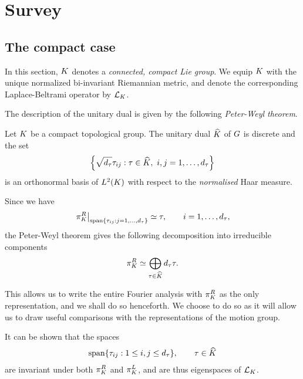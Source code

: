 \chapter{Survey}

\section{The compact case}

In this section,
$\CompactGroup$ denotes a \emph{connected, compact Lie group}.
We equip $\CompactGroup$ with the unique normalized bi-invariant Riemannian metric,
and denote the corresponding Laplace-Beltrami operator by $\Laplacian [\CompactGroup]$.

The description of the unitary dual is given by the following \emph{Peter-Weyl theorem}.

\begin{theorem}
\label{theorem:Peter-Weyl_theorem}
    Let $\CompactGroup$ be a compact topological group.
    The unitary dual $\dualGroup \CompactGroup$ of $\Group$ is discrete and
    the set
    \begin{align*}
        \left\{
            \sqrt{\dimRep\tau} \tau_{ij} : \tau \in \dualGroup\CompactGroup,\ i, j = 1, \dots, \dimRep\tau
        \right\}
    \end{align*}
    is an orthonormal basis of $\Lebesgue{2}{\CompactGroup}$ with respect to the \emph{normalised} Haar measure.
\end{theorem}

Since we have
\begin{align*}
    \eval \RightRegularRepresentation {\Span \{\tau_{i j} : j = 1, \dots, \dimRep \tau\}} \simeq \tau,
    \qquad i = 1, \dots, \dimRep \tau,
\end{align*}
the Peter-Weyl theorem gives the following decomposition into irreducible components
\begin{align*}
    \RightRegularRepresentation \simeq \bigoplus_{\tau \in \dualGroup \CompactGroup} \dimRep \tau \tau.
\end{align*}

This allows us to write the entire Fourier analysis with $\RightRegularRepresentation$ as the only representation,
and we shall do so henceforth.
We choose to do so as it will allow us to draw useful comparisons with the representations of the motion group.

It can be shown that the spaces
\begin{align*}
    \Span \{ \tau_{i j} : 1 \leq i, j \leq \dimRep \tau\}, \qquad \tau \in \dualGroup \CompactGroup
\end{align*}
are invariant under both $\RightRegularRepresentation$ and $\LeftRegularRepresentation$,
and are thus eigenspaces of $\Laplacian [\CompactGroup]$.


